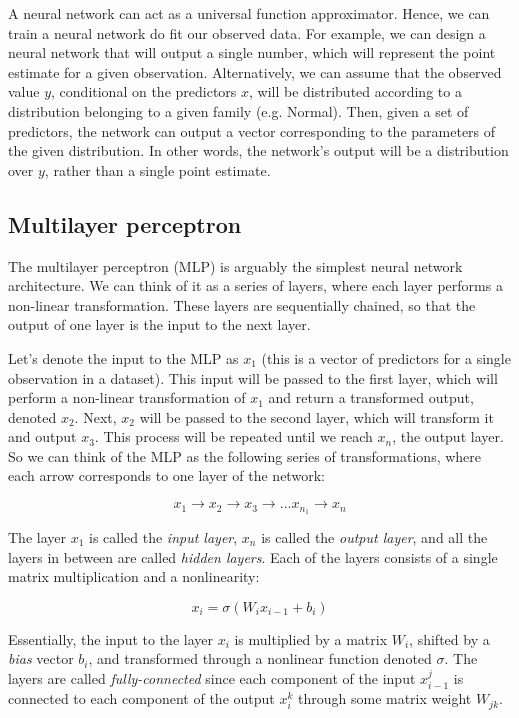 \documentclass[12pt]{article}
\begin{document}
A neural network can act as a universal function approximator. Hence, we can train a neural network do fit our observed data. For example, we can design a neural network that will output a single number, which will represent the point estimate for a given observation. Alternatively, we can assume that the observed value $y$, conditional on the predictors $x$, will be distributed according to a distribution belonging to a given family (e.g. Normal). Then, given a set of predictors, the network can output a vector corresponding to the parameters of the given distribution. In other words, the network's output will be a distribution over $y$, rather than a single point estimate. 

\subsection{Multilayer perceptron}

The multilayer perceptron (MLP) is arguably the simplest neural network architecture. We can think of it as a series of layers, where each layer performs a non-linear transformation. These layers are sequentially chained, so that the output of one layer is the input to the next layer.

Let's denote the input to the MLP as $x_1$ (this is a vector of predictors for a single observation in a dataset). This input will be passed to the first layer, which will perform a non-linear transformation of $x_1$ and return a transformed output, denoted $x_2$. Next, $x_2$ will be passed to the second layer, which will transform it and output $x_3$. This process will be repeated until we reach $x_n$, the output layer. So we can think of the MLP as the following series of transformations, where each arrow corresponds to one layer of the network:

\begin{equation}
x_1 \rightarrow x_2 \rightarrow x_3 \rightarrow \ldots x_{n_1} \rightarrow x_n
\end{equation}

The layer $x_1$ is called the \textit{input layer}, $x_n$ is called the \textit{output layer}, and all the layers in between are called \textit{hidden layers}. Each of the layers consists of a single matrix multiplication and a nonlinearity:

\begin{equation}
x_i = \sigma(W_i x_{i-1} + b_i)
\end{equation}

Essentially, the input to the layer $x_i$ is multiplied by a matrix $W_i$, shifted by a \textit{bias} vector $b_i$, and transformed through a nonlinear function denoted $\sigma$. The layers are called \textit{fully-connected} since each component of the input $x_{i-1}^j$ is connected to each component of the output $x_i^k$ through some matrix weight $W_{jk}$.
\end{document}
